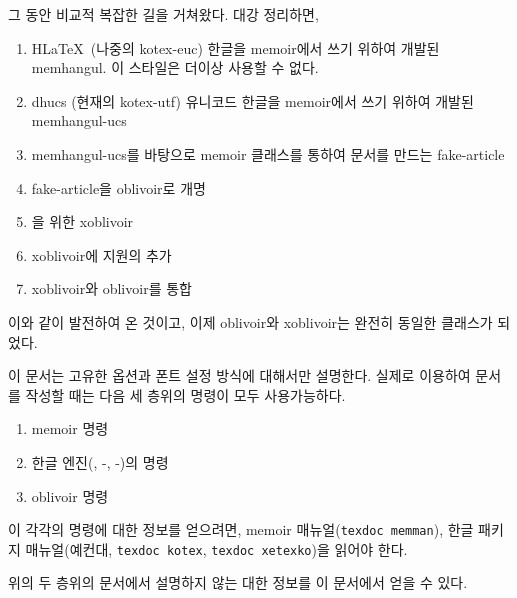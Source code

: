 \documentclass[
	12pt,
	a4paper,
	kosection,
	footnote,
	microtype,
	figtabcapt,
]{oblivoir}
\newcommand\obclass{ob\-liv\-oir\oblivoirallowbreak}
\begin{document}
그 동안  비교적 복잡한 길을 거쳐왔다. 대강 정리하면,
\begin{enumerate}[(1)]\tightlist
\item H\LaTeX\ (나중의 kotex-euc) 한글을 memoir에서 쓰기 위하여 개발된 memhangul. 이 스타일은 더이상 사용할 수 없다.
\item dhucs (현재의 kotex-utf) 유니코드 한글을 memoir에서 쓰기 위하여 개발된 memhangul-ucs
\item memhangul-ucs를 바탕으로 memoir 클래스를 통하여 문서를 만드는 fake-article
\item fake-article을 oblivoir로 개명
\item {}을 위한 xoblivoir
\item xoblivoir에  지원의 추가
\item xoblivoir와 oblivoir를 통합
\end{enumerate}
이와 같이 발전하여 온 것이고, 이제 oblivoir와 xoblivoir는 완전히 동일한 클래스가 되었다.

이 문서는  고유한 옵션과 폰트 설정 방식에 대해서만 설명한다. 실제로 
이용하여 문서를 작성할 때는 다음 세 층위의 명령이 모두 사용가능하다.
\begin{enumerate}[(1)]\tightlist
\item memoir 명령
\item 한글 엔진(\koTeX, \XeTeX-\ko, \LuaTeX-\ko)의 명령
\item oblivoir 명령
\end{enumerate}

이 각각의 명령에 대한 정보를 얻으려면, memoir 매뉴얼(\texttt{texdoc memman}), 
한글 패키지 매뉴얼(예컨대, \texttt{texdoc kotex}, \texttt{texdoc xetexko})을
읽어야 한다.

위의 두 층위의 문서에서 설명하지 않는  대한 정보를 이 문서에서 얻을 수 있다.
\end{document}
